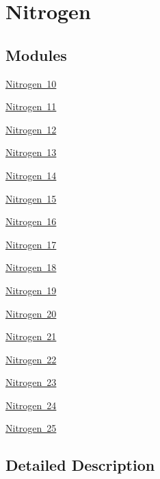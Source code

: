 \hypertarget{group___isotope_const-_nitrogen}{}\section{Nitrogen}
\label{group___isotope_const-_nitrogen}
\subsection*{Modules}
\begin{DoxyCompactItemize}
\item 
\mbox{\hyperlink{group___isotope_const-_nitrogen-_n10}{Nitrogen 10}}
\item 
\mbox{\hyperlink{group___isotope_const-_nitrogen-_n11}{Nitrogen 11}}
\item 
\mbox{\hyperlink{group___isotope_const-_nitrogen-_n12}{Nitrogen 12}}
\item 
\mbox{\hyperlink{group___isotope_const-_nitrogen-_n13}{Nitrogen 13}}
\item 
\mbox{\hyperlink{group___isotope_const-_nitrogen-_n14}{Nitrogen 14}}
\item 
\mbox{\hyperlink{group___isotope_const-_nitrogen-_n15}{Nitrogen 15}}
\item 
\mbox{\hyperlink{group___isotope_const-_nitrogen-_n16}{Nitrogen 16}}
\item 
\mbox{\hyperlink{group___isotope_const-_nitrogen-_n17}{Nitrogen 17}}
\item 
\mbox{\hyperlink{group___isotope_const-_nitrogen-_n18}{Nitrogen 18}}
\item 
\mbox{\hyperlink{group___isotope_const-_nitrogen-_n19}{Nitrogen 19}}
\item 
\mbox{\hyperlink{group___isotope_const-_nitrogen-_n20}{Nitrogen 20}}
\item 
\mbox{\hyperlink{group___isotope_const-_nitrogen-_n21}{Nitrogen 21}}
\item 
\mbox{\hyperlink{group___isotope_const-_nitrogen-_n22}{Nitrogen 22}}
\item 
\mbox{\hyperlink{group___isotope_const-_nitrogen-_n23}{Nitrogen 23}}
\item 
\mbox{\hyperlink{group___isotope_const-_nitrogen-_n24}{Nitrogen 24}}
\item 
\mbox{\hyperlink{group___isotope_const-_nitrogen-_n25}{Nitrogen 25}}
\end{DoxyCompactItemize}


\subsection{Detailed Description}
